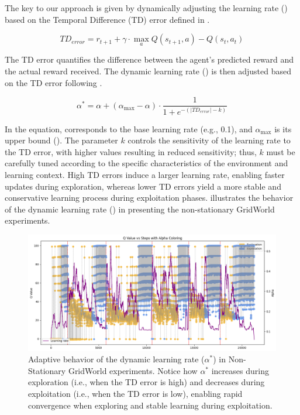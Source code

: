 The key to our approach is given by dynamically adjusting the learning rate (\lrate{\alpha}) based on 
the Temporal Difference (TD) error defined in .

\begin{equation} \label{eq:td_error}
    TD_{error} = r_{t+1} + \gamma \cdot \underset{a}{\max} Q(s_{t+1}, a) - Q(s_t, a_t)
\end{equation}

The TD error quantifies the difference between the agent's predicted reward and the actual reward 
received. The dynamic learning rate (\lrate{\alpha^*}) is then adjusted based on the TD error following  
.

\begin{equation}
    \label{eq:dynamic_learning_rate}
    \alpha^* = \alpha + (\alpha_{\max}-\alpha) \cdot \frac{1}{1 + e^{-(|TD_{error}|-k)}}
\end{equation}

In the equation, \lrate{\alpha} corresponds to the base learning rate (e.g., 0.1), and $\alpha_{\max}$ is its upper bound (). The parameter $k$ controls the sensitivity of the learning rate to the TD error, with higher values resulting in reduced sensitivity; thus, $k$ must be carefully tuned according to the specific characteristics of the environment and learning context. High TD errors induce a larger learning rate, enabling faster updates during exploration, whereas lower TD errors yield a more stable and conservative learning process during exploitation phases.  illustrates the behavior of the dynamic learning rate (\lrate{\alpha^*}) in  presenting the non-stationary GridWorld experiments. 

\begin{figure}
    \centering
    \includegraphics[width=\textwidth]{figures/alpha.png}
    \caption{Adaptive behavior of the dynamic learning rate ($\alpha^*$) in Non-Stationary GridWorld experiments. Notice how $\alpha^*$ increases during exploration (i.e., when the TD error is high) and decreases during exploitation (i.e., when the TD error is low), enabling rapid convergence when exploring and stable learning during exploitation.}
    \label{fig:alpha}
\end{figure}

